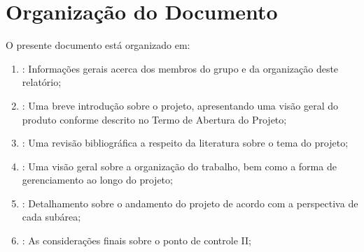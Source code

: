 	\section{Organização do Documento}
	\label{sec:apresentacao_organizacao}

		O presente documento está organizado em: 

		\begin{enumerate}
			\item{\textbf{}: Informações gerais acerca dos membros do grupo e da organização deste relatório;}
			\item{\textbf{}: Uma breve introdução sobre o projeto, apresentando uma visão geral do produto conforme descrito no Termo de Abertura do Projeto;}
			\item{\textbf{}: Uma revisão bibliográfica a respeito da literatura sobre o tema do projeto;}
			\item{\textbf{}: Uma visão geral sobre a organização do trabalho, bem como a forma de gerenciamento ao longo do projeto;}
			\item{\textbf{}: Detalhamento sobre o andamento do projeto de acordo com a perspectiva de cada subárea;}
			\item{\textbf{}: As considerações finais sobre o ponto de controle II;}
		\end{enumerate}

